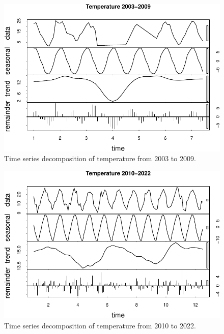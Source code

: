 \documentclass[
  12pt,
]{article}
\begin{document}
\begin{figure}

{\centering \includegraphics{Project_Template_files/figure-latex/Plot of Early Temperature Time Series Decomposition-1} 

}

\caption{Time series decomposition of temperature from 2003 to 2009.}\label{fig:Plot of Early Temperature Time Series Decomposition}
\end{figure}

\begin{figure}

{\centering \includegraphics{Project_Template_files/figure-latex/Plot of Late Temperature Time Series Decomposition-1} 

}

\caption{Time series decomposition of temperature from 2010 to 2022.}\label{fig:Plot of Late Temperature Time Series Decomposition}
\end{figure}
\end{document}
